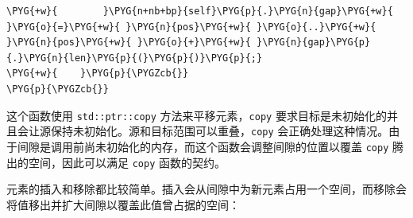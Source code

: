 \begin{Verbatim}[commandchars=\\\{\},breaklines=true,breakanywhere=true,fontsize=\codefont,xleftmargin=17bp]
\PYG{+w}{        }\PYG{n+nb+bp}{self}\PYG{p}{.}\PYG{n}{gap}\PYG{+w}{ }\PYG{o}{=}\PYG{+w}{ }\PYG{n}{pos}\PYG{+w}{ }\PYG{o}{..}\PYG{+w}{ }\PYG{n}{pos}\PYG{+w}{ }\PYG{o}{+}\PYG{+w}{ }\PYG{n}{gap}\PYG{p}{.}\PYG{n}{len}\PYG{p}{(}\PYG{p}{)}\PYG{p}{;}
\PYG{+w}{    }\PYG{p}{\PYGZcb{}}
\PYG{p}{\PYGZcb{}}
\end{Verbatim}

这个函数使用 \texttt{std::ptr::copy} 方法来平移元素，\texttt{copy} 要求目标是未初始化的并且会让源保持未初始化。源和目标范围可以重叠，\texttt{copy} 会正确处理这种情况。由于间隙是调用前尚未初始化的内存，而这个函数会调整间隙的位置以覆盖 \texttt{copy} 腾出的空间，因此可以满足 \texttt{copy} 函数的契约。

元素的插入和移除都比较简单。插入会从间隙中为新元素占用一个空间，而移除会将值移出并扩大间隙以覆盖此值曾占据的空间：

